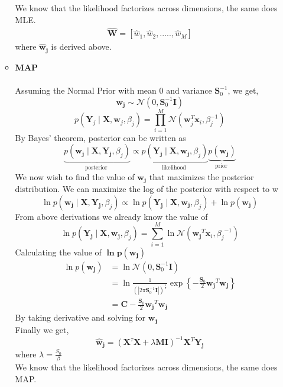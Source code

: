 \documentclass[english,a4paper,12pt]{article}
\begin{document}
\begin{enumerate}
\begin{itemize}
We know that the likelihood factorizes across dimensions, the same does MLE.
$$
\begin{aligned}
{\hat{\mathbf{W}}}=[\hat w_{1},\hat w_{2},.....,\hat w_{M}]
\end{aligned}
$$
where $\boldsymbol{\hat w_{j}}$ is derived above.\\
\item \textbf{MAP}\\~\\
Assuming the Normal Prior with mean 0 and variance $\boldsymbol{S}_{0}^{-1}$, we get,
$$
\mathbf{w_{j}} \sim \mathcal{N}\left(0, \boldsymbol{S}_{0}^{-1} \mathbf{I}\right)
$$
$$
p(\mathbf{Y}_{j} \mid \mathbf{X}, \mathbf{w}_{j}, \beta_{j})=\prod_{i=1}^{M} \mathcal{N}\left(\mathbf{w}_{j}^{T} \mathbf{x}_{i}, \beta_{j}^{-1}\right)
$$
By Bayes' theorem, posterior can be written as
$$
\underbrace{p(\mathbf{w_j} \mid \mathbf{X}, \mathbf{Y_j}, \beta_j)}_{\text {posterior }} \propto \underbrace{p(\mathbf{Y_j} \mid \mathbf{X}, \mathbf{w_j}, \beta_j)}_{\text {likelihood }} \underbrace{p(\mathbf{w_j})}_{\text {prior }}
$$
We now wish to find the value of $\mathbf{w_j}$ that maximizes the posterior distribution. We can maximize the log of the posterior with respect to w  
$$
\ln p(\mathbf{w_j} \mid \mathbf{X}, \mathbf{Y_j}, \beta_j) \propto \ln p(\mathbf{Y_j} \mid \mathbf{X}, \mathbf{w_j}, \beta_j)+\ln p(\mathbf{w_j})
$$
From above derivations we already know the value of 
$$
\ln p(\mathbf{Y_j} \mid \mathbf{X}, \mathbf{w_j}, \beta_{j})=\sum_{i=1}^{M} \ln \mathcal{N}\left(\mathbf{w_j}^{T} \mathbf{x}_{i}, {\beta_j}^{-1}\right)
$$
Calculating the value of $\mathbf{\ln p(w_j)}$
$$
\begin{aligned}
\ln p(\mathbf{w_j}) &=\ln \mathcal{N}\left(0, \boldsymbol{S}_{0}^{-1} \mathbf{I}\right) \\
&=\ln \frac{1}{\left(\left|2 \pi \boldsymbol{S}_{0}^{-1} \mathbf{I}\right|\right)^{\frac{1}{2}}} \exp \left\{-\frac{\boldsymbol{S}_{0}}{2} \mathbf{w_j}^{T} \mathbf{w_j}\right\} \\
&=\mathbf{C}-\frac{\boldsymbol{S}_{0}}{2} \mathbf{w_j}^{T} \mathbf{w_j}
\end{aligned}
$$
By taking derivative and solving for $\boldsymbol{ w_{j}}$\\ Finally we get,
$$
\boldsymbol{\hat w_{j}}=\left(\boldsymbol{X}^{\tau} \boldsymbol{X}+\lambda \boldsymbol{M} \boldsymbol{I}\right)^{-1} \boldsymbol{X}^{T} \boldsymbol{Y_j}
$$
where $\lambda = \frac{S_0}{\beta}$\\
We know that the likelihood factorizes across dimensions, the same does MAP.

\end{itemize}
\end{enumerate}
\end{document}
